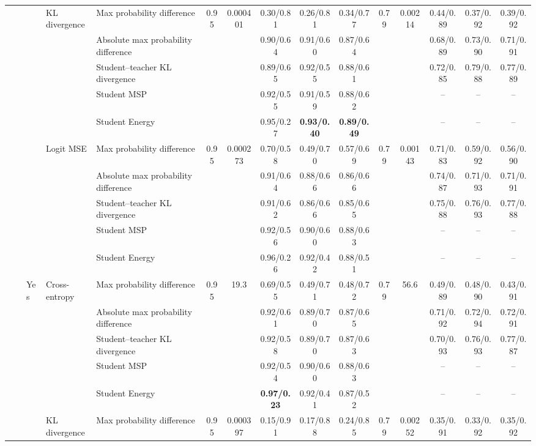 \documentclass[border=2pt]{standalone}
\begin{document}
\begin{tabular}{lllllcccccccccc}
 &  &  & KL divergence & Max probability difference & 0.95 & 0.000401 & 0.30/0.81 & 0.26/0.81 & 0.34/0.77 & 0.79 & 0.00214 & 0.44/0.89 & 0.37/0.92 & 0.39/0.92 \\
 &  &  &  & Absolute max probability difference &  &  & 0.90/0.64 & 0.91/0.60 & 0.87/0.64 &  &  & 0.68/0.89 & 0.73/0.90 & 0.71/0.91 \\
 &  &  &  & Student--teacher KL divergence &  &  & 0.89/0.65 & 0.92/0.55 & 0.88/0.61 &  &  & 0.72/0.85 & 0.79/0.88 & 0.77/0.89 \\
 &  &  &  & Student MSP &  &  & 0.92/0.55 & 0.91/0.59 & 0.88/0.62 &  &  & -- & -- & -- \\
 &  &  &  & Student Energy &  &  & 0.95/0.27 & \textbf{0.93/0.40} & \textbf{0.89/0.49} &  &  & -- & -- & -- \\
 &  &  & Logit MSE & Max probability difference & 0.95 & 0.000273 & 0.70/0.58 & 0.49/0.70 & 0.57/0.69 & 0.79 & 0.00143 & 0.71/0.83 & 0.59/0.92 & 0.56/0.90 \\
 &  &  &  & Absolute max probability difference &  &  & 0.91/0.64 & 0.88/0.66 & 0.86/0.66 &  &  & 0.74/0.87 & 0.71/0.93 & 0.71/0.91 \\
 &  &  &  & Student--teacher KL divergence &  &  & 0.91/0.62 & 0.86/0.66 & 0.85/0.65 &  &  & 0.75/0.88 & 0.76/0.93 & 0.77/0.88 \\
 &  &  &  & Student MSP &  &  & 0.92/0.56 & 0.90/0.60 & 0.88/0.63 &  &  & -- & -- & -- \\
 &  &  &  & Student Energy &  &  & 0.96/0.26 & 0.92/0.42 & 0.88/0.51 &  &  & -- & -- & -- \\
 &  & Yes & Cross-entropy & Max probability difference & 0.95 & 19.3 & 0.69/0.55 & 0.49/0.71 & 0.48/0.72 & 0.79 & 56.6 & 0.49/0.89 & 0.48/0.90 & 0.43/0.91 \\
 &  &  &  & Absolute max probability difference &  &  & 0.92/0.61 & 0.89/0.70 & 0.87/0.65 &  &  & 0.71/0.92 & 0.72/0.94 & 0.72/0.91 \\
 &  &  &  & Student--teacher KL divergence &  &  & 0.92/0.58 & 0.89/0.70 & 0.87/0.63 &  &  & 0.70/0.93 & 0.76/0.93 & 0.77/0.87 \\
 &  &  &  & Student MSP &  &  & 0.92/0.54 & 0.90/0.60 & 0.88/0.63 &  &  & -- & -- & -- \\
 &  &  &  & Student Energy &  &  & \textbf{0.97/0.23} & 0.92/0.41 & 0.87/0.52 &  &  & -- & -- & -- \\
 &  &  & KL divergence & Max probability difference & 0.95 & 0.000397 & 0.15/0.91 & 0.17/0.88 & 0.24/0.85 & 0.79 & 0.00252 & 0.35/0.91 & 0.33/0.92 & 0.35/0.92 \\

\end{tabular}
\end{document}
